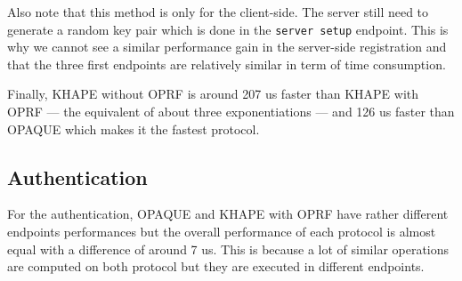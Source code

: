 \documentclass[../report.tex]{subfiles}
\begin{document}
Also note that this method is only for the client-side. The server still need to generate a random key pair which is done in the \verb|server setup| endpoint. This is why we cannot see a similar performance gain in the server-side registration and that the three first endpoints are relatively similar in term of time consumption.


Finally, KHAPE without OPRF is around 207 us faster than KHAPE with OPRF --- the equivalent of about three exponentiations --- and 126 us faster than OPAQUE which makes it the fastest protocol.






\subsection*{Authentication}

For the authentication, OPAQUE and KHAPE with OPRF have rather different endpoints performances but the overall performance of each protocol is almost equal with a difference of around 7 us.
This is because a lot of similar operations are computed on both protocol but they are executed in different endpoints.
\end{document}

